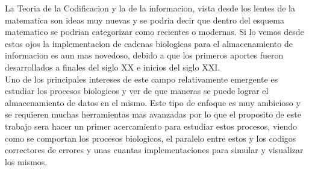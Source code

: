 
La Teoria de la Codificacion y la de la informacion, vista desde los lentes de la matematica son ideas muy nuevas y se podria decir que dentro del esquema matematico se podrian categorizar como recientes o modernas. Si lo vemos desde estos ojos la implementacion de cadenas biologicas para el almacenamiento de informacion es aun mas novedoso, debido a que los primeros aportes fueron desarrollados a finales del siglo XX e inicios del siglo XXI.\\

Uno de los principales intereses de este campo relativamente emergente es estudiar los procesos biologicos y ver de que maneras se puede lograr el almacenamiento de datos en el mismo. Este tipo de enfoque es muy ambicioso y se requieren muchas herramientas mas avanzadas por lo que el proposito de este trabajo sera hacer un primer acercamiento para estudiar estos procesos, viendo como se comportan los procesos biologicos, el paralelo entre estos y los codigos correctores de errores y unas cuantas implementaciones para simular y visualizar los mismos.